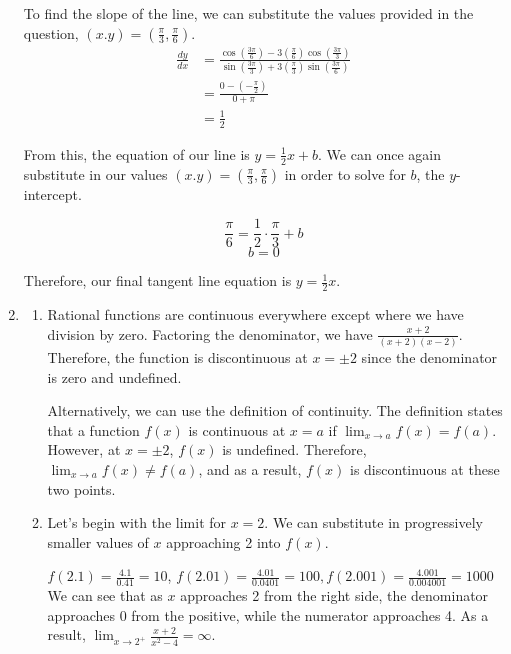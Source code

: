 \documentclass[11pt, letterpaper, twoside]{article}
\begin{document}
\begin{enumerate}
To find the slope of the line, we can substitute the values provided in the question, \((x.y)=(\frac{\pi}{3}, \frac{\pi}{6})\).
\begin{align*}
	\frac{dy}{dx}&=\frac{\cos\left(\frac{3\pi}{6}\right)-3\left(\frac{\pi}{6}\right)\cos\left(\frac{3\pi}{3}\right)}{\sin\left(\frac{3\pi}{3}\right)+3\left(\frac{\pi}{3}\right)\sin\left(\frac{3\pi}{6}\right)}\\
	&=\frac{0-\left(-\frac{\pi}{2}\right)}{0+\pi}\\
	&=\frac{1}{2}
\end{align*}

From this, the equation of our line is \(y=\frac{1}{2}x+b\). 
We can once again substitute in our values \((x.y)=(\frac{\pi}{3}, \frac{\pi}{6})\) in order to solve for \(b\), the \(y\)-intercept.

\[\frac{\pi}{6}=\frac{1}{2}\cdot\frac{\pi}{3}+b\]
\[b=0\]

Therefore, our final tangent line equation is \(\boxed{y=\frac{1}{2}x}\).

\newpage

\item \begin{enumerate}[label=\alph*)]
\item Rational functions are continuous everywhere except where we have division by zero. 
Factoring the denominator, we have \(\frac{x+2}{(x+2)(x-2)}\). 
Therefore, the function is discontinuous at \(x=\pm2\) since the denominator is zero and undefined.

Alternatively, we can use the definition of continuity. 
The definition states that a function \(f(x)\) is continuous at \(x=a\) if \(\lim_{x\to a}f(x)=f(a)\).
However, at \(x=\pm2\), \(f(x)\) is undefined. Therefore, \(\lim_{x\to a}f(x)\neq f(a)\), and as a result, \(f(x)\) is discontinuous at these two points.
\item Let's begin with the limit for \(x=2\). 
We can substitute in progressively smaller values of \(x\) approaching 2 into \(f(x)\).
\vspace{0.1cm}

\(f(2.1)=\frac{4.1}{0.41}=10\), \(f(2.01)=\frac{4.01}{0.0401}=100, f(2.001)=\frac{4.001}{0.004001}=1000\)\\

We can see that as \(x\) approaches 2 from the right side, the denominator approaches 0 from the positive, while the numerator approaches 4. 
As a result, \(\lim_{x\to2^+}\frac{x+2}{x^2-4}=\infty\).\\


\end{enumerate}
\end{enumerate}
\end{document}
